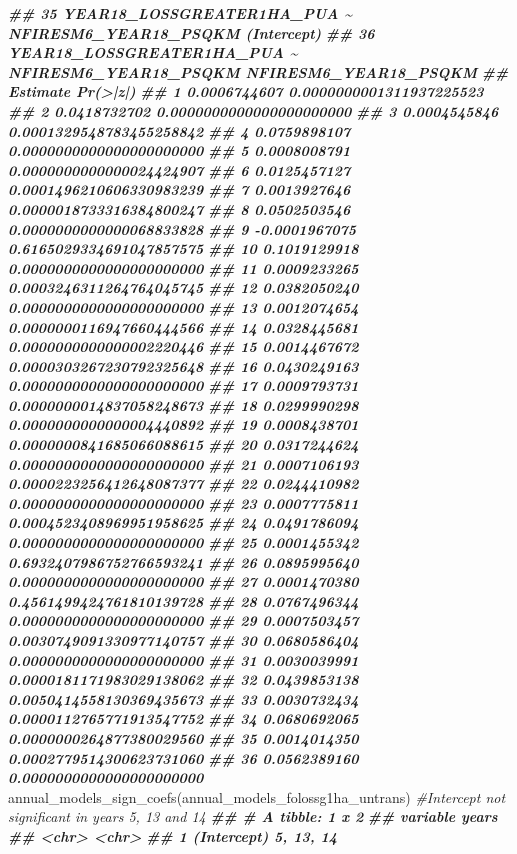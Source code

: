\documentclass[10pt,landscape,a3paper]{article}
\newenvironment{Shaded}{\begin{snugshade}}{\end{snugshade}}
\newcommand{\CommentTok}[1]{\textcolor[rgb]{0.56,0.35,0.01}{\textit{#1}}}
\newcommand{\DocumentationTok}[1]{\textcolor[rgb]{0.56,0.35,0.01}{\textbf{\textit{#1}}}}
\newcommand{\FunctionTok}[1]{\textcolor[rgb]{0.00,0.00,0.00}{#1}}
\newcommand{\NormalTok}[1]{#1}
\begin{document}
\begin{Shaded}
\begin{Highlighting}[]
\DocumentationTok{\#\# 35 YEAR18\_LOSSGREATER1HA\_PUA \textasciitilde{} NFIRESM6\_YEAR18\_PSQKM           (Intercept)}
\DocumentationTok{\#\# 36 YEAR18\_LOSSGREATER1HA\_PUA \textasciitilde{} NFIRESM6\_YEAR18\_PSQKM NFIRESM6\_YEAR18\_PSQKM}
\DocumentationTok{\#\#         Estimate                 Pr(\textgreater{}|z|)}
\DocumentationTok{\#\# 1   0.0006744607 0.0000000001311937225523}
\DocumentationTok{\#\# 2   0.0418732702 0.0000000000000000000000}
\DocumentationTok{\#\# 3   0.0004545846 0.0001329548783455258842}
\DocumentationTok{\#\# 4   0.0759898107 0.0000000000000000000000}
\DocumentationTok{\#\# 5   0.0008008791 0.0000000000000024424907}
\DocumentationTok{\#\# 6   0.0125457127 0.0001496210606330983239}
\DocumentationTok{\#\# 7   0.0013927646 0.0000018733316384800247}
\DocumentationTok{\#\# 8   0.0502503546 0.0000000000000068833828}
\DocumentationTok{\#\# 9  {-}0.0001967075 0.6165029334691047857575}
\DocumentationTok{\#\# 10  0.1019129918 0.0000000000000000000000}
\DocumentationTok{\#\# 11  0.0009233265 0.0003246311264764045745}
\DocumentationTok{\#\# 12  0.0382050240 0.0000000000000000000000}
\DocumentationTok{\#\# 13  0.0012074654 0.0000000116947660444566}
\DocumentationTok{\#\# 14  0.0328445681 0.0000000000000002220446}
\DocumentationTok{\#\# 15  0.0014467672 0.0000303267230792325648}
\DocumentationTok{\#\# 16  0.0430249163 0.0000000000000000000000}
\DocumentationTok{\#\# 17  0.0009793731 0.0000000014837058248673}
\DocumentationTok{\#\# 18  0.0299990298 0.0000000000000004440892}
\DocumentationTok{\#\# 19  0.0008438701 0.0000000841685066088615}
\DocumentationTok{\#\# 20  0.0317244624 0.0000000000000000000000}
\DocumentationTok{\#\# 21  0.0007106193 0.0000223256412648087377}
\DocumentationTok{\#\# 22  0.0244410982 0.0000000000000000000000}
\DocumentationTok{\#\# 23  0.0007775811 0.0004523408969951958625}
\DocumentationTok{\#\# 24  0.0491786094 0.0000000000000000000000}
\DocumentationTok{\#\# 25  0.0001455342 0.6932407986752766593241}
\DocumentationTok{\#\# 26  0.0895995640 0.0000000000000000000000}
\DocumentationTok{\#\# 27  0.0001470380 0.4561499424761810139728}
\DocumentationTok{\#\# 28  0.0767496344 0.0000000000000000000000}
\DocumentationTok{\#\# 29  0.0007503457 0.0030749091330977140757}
\DocumentationTok{\#\# 30  0.0680586404 0.0000000000000000000000}
\DocumentationTok{\#\# 31  0.0030039991 0.0000181171983029138062}
\DocumentationTok{\#\# 32  0.0439853138 0.0050414558130369435673}
\DocumentationTok{\#\# 33  0.0030732434 0.0000112765771913547752}
\DocumentationTok{\#\# 34  0.0680692065 0.0000000264877380029560}
\DocumentationTok{\#\# 35  0.0014014350 0.0002779514300623731060}
\DocumentationTok{\#\# 36  0.0562389160 0.0000000000000000000000}
\FunctionTok{annual\_models\_sign\_coefs}\NormalTok{(annual\_models\_folossg1ha\_untrans)  }\CommentTok{\#Intercept not significant in years 5, 13 and 14}
\DocumentationTok{\#\# \# A tibble: 1 x 2}
\DocumentationTok{\#\#   variable    years    }
\DocumentationTok{\#\#   \textless{}chr\textgreater{}       \textless{}chr\textgreater{}    }
\DocumentationTok{\#\# 1 (Intercept) 5, 13, 14}


\end{Highlighting}
\end{Shaded}
\end{document}
